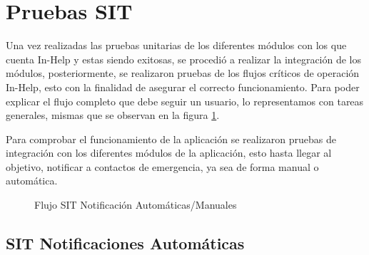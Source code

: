 
\section{Pruebas SIT}

Una vez realizadas las pruebas unitarias de los diferentes módulos con los que cuenta In-Help y estas siendo exitosas, se procedió a realizar la integración de los módulos, posteriormente, se realizaron pruebas de los flujos críticos de operación In-Help, esto con la finalidad de asegurar el correcto funcionamiento. Para poder explicar el flujo completo que debe seguir un usuario, lo representamos con tareas generales, mismas que se observan en la figura \ref{fig:FNSIT}.

Para comprobar el funcionamiento de la aplicación se realizaron pruebas de integración con los diferentes módulos de la aplicación, esto hasta llegar al objetivo, notificar a contactos de emergencia, ya sea de forma manual o automática.\\


\begin{figure}[htbp!]
	\centering
	\caption{Flujo SIT Notificación Automáticas/Manuales}
	\label{fig:FNSIT}
\end{figure}

\subsection{SIT Notificaciones Automáticas}

